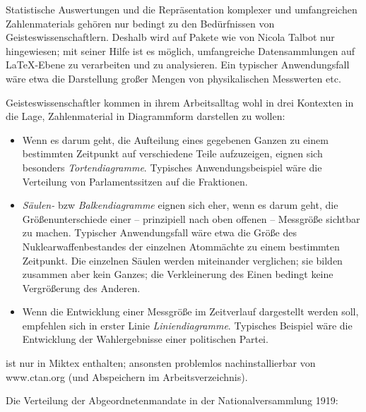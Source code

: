Statistische Auswertungen und die Repräsentation komplexer und umfangreichen Zahlenmaterials
gehören nur bedingt zu den Bedürfnissen von Geisteswissenschaftlern.
Deshalb wird auf Pakete wie  von Nicola Talbot nur hingewiesen; mit seiner Hilfe
ist es möglich, umfangreiche Datensammlungen auf \LaTeX -Ebene zu verarbeiten und zu analysieren.
Ein typischer Anwendungsfall wäre etwa die Darstellung großer Mengen von physikalischen Messwerten etc.

Geisteswissenschaftler kommen in ihrem Arbeitsalltag wohl in drei Kontexten in die Lage,
Zahlenmaterial in Diagrammform darstellen zu wollen:

\begin{itemize}
    \item Wenn es darum geht, die Aufteilung eines gegebenen Ganzen zu einem bestimmten Zeitpunkt
        auf verschiedene Teile aufzuzeigen, eignen sich besonders \emph{Tortendiagramme}.
        Typisches Anwendungsbeispiel wäre die Verteilung von Parlamentssitzen auf die Fraktionen.
    \item \emph{Säulen-} bzw \emph{Balkendiagramme} eignen sich eher, wenn es darum geht, die
        Größenunterschiede einer -- prinzipiell nach oben offenen -- Messgröße sichtbar zu machen.
        Typischer Anwendungsfall wäre etwa die Größe des Nuklearwaffenbestandes der einzelnen
        Atommächte zu einem bestimmten Zeitpunkt. Die einzelnen Säulen werden miteinander verglichen;
        sie bilden zusammen aber kein Ganzes; die Verkleinerung des Einen bedingt keine Vergrößerung
        des Anderen. 
    \item Wenn die Entwicklung einer Messgröße im Zeitverlauf dargestellt werden soll, empfehlen
        sich in erster Linie \emph{Liniendiagramme}.
        Typisches Beispiel wäre die Entwicklung der Wahlergebnisse einer politischen Partei. 
\end{itemize}


 ist nur in Miktex enthalten; ansonsten problemlos nachinstallierbar von 
www.ctan.org (und Abspeichern im Arbeitsverzeichnis).

Die Verteilung der Abgeordnetenmandate in der Nationalversammlung 1919:

\begin{lfgwexample}{}
\end{lfgwexample}


